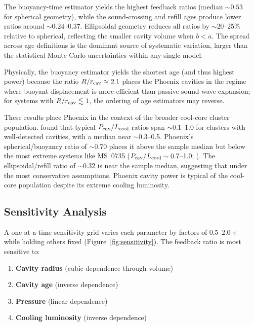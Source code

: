 \documentclass[twocolumn]{aastex63}
\newcommand{\Lcool}{L_{\rm cool}}
\newcommand{\Pcav}{P_{\rm cav}}
\newcommand{\rcav}{r_{\rm cav}}
\begin{document}
The buoyancy-time estimator yields the highest feedback ratios (median
${\sim}0.53$ for spherical geometry), while the sound-crossing and refill ages
produce lower ratios around ${\sim}0.24$--0.37. Ellipsoidal geometry reduces all
ratios by ${\sim}20$--25\% relative to spherical, reflecting the smaller cavity
volume when $b < a$. The spread across age definitions is the dominant source of
systematic variation, larger than the statistical Monte Carlo uncertainties
within any single model.

Physically, the buoyancy estimator yields the shortest age (and thus highest
power) because the ratio $R/\rcav \approx 2.1$ places the Phoenix cavities in
the regime where buoyant displacement is more efficient than passive sound-wave
expansion; for systems with $R/\rcav \lesssim 1$, the ordering of age
estimators may reverse.

These results place Phoenix in the context of the broader cool-core cluster
population. \citet{Rafferty2006} found that typical $\Pcav/\Lcool$ ratios span
${\sim}0.1$--1.0 for clusters with well-detected cavities, with a median near
${\sim}0.3$--0.5. Phoenix's spherical/buoyancy ratio of ${\sim}0.70$ places it
above the sample median but below the most extreme systems like MS~0735
($\Pcav/\Lcool \sim 0.7$--1.0; \citealt{McNamara2005}). The
ellipsoidal/refill ratio of ${\sim}0.32$ is near the sample median, suggesting
that under the most conservative assumptions, Phoenix cavity power is typical of
the cool-core population despite its extreme cooling luminosity.

\subsection{Sensitivity Analysis}
\label{sec:sensitivity}

A one-at-a-time sensitivity grid varies each parameter by factors of
$0.5$--$2.0\times$ while holding others fixed (Figure~\ref{fig:sensitivity}).
The feedback ratio is most sensitive to:

\begin{enumerate}
  \item \textbf{Cavity radius} (cubic dependence through volume)
  \item \textbf{Cavity age} (inverse dependence)
  \item \textbf{Pressure} (linear dependence)
  \item \textbf{Cooling luminosity} (inverse dependence)
\end{enumerate}
\end{document}
